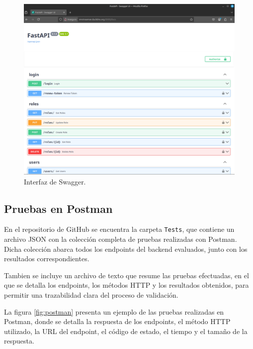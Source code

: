 \begin{figure}[H]
    \centering
    \includegraphics[width=\textwidth]{Images/37_swagger.png}
    \caption[Interfaz de Swagger]{Interfaz de Swagger.}
    \label{fig:swagger}
\end{figure}

\subsection{Pruebas en Postman}

En el repositorio de GitHub \cite{EnviroSenseIoT} se encuentra la carpeta
\texttt{Tests}, que contiene un archivo JSON con la colección completa de
pruebas realizadas con Postman. Dicha colección abarca todos los endpoints del
backend evaluados, junto con los resultados correspondientes.

Tambien se incluye un archivo de texto que resume las pruebas efectuadas, en el
que se detalla los endpoints, los métodos HTTP y los resultados obtenidos, para
permitir una trazabilidad clara del proceso de validación.

La figura \ref{fig:postman} presenta un ejemplo de las pruebas realizadas en
Postman, donde se detalla la respuesta de los endpoints, el método HTTP
utilizado, la URL del endpoint, el código de estado, el tiempo y el tamaño de
la respuesta.

